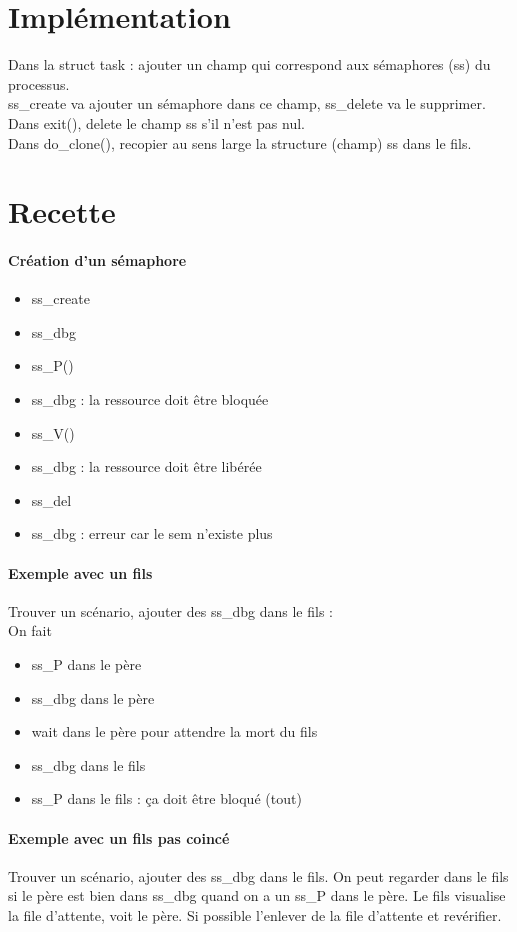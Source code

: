 \documentclass[12pt]{article}
\begin{document}
\newpage
\section{Implémentation}
Dans la struct task : ajouter un champ qui correspond aux sémaphores (ss) du processus. \\
ss\_create va ajouter un sémaphore dans ce champ, ss\_delete va le supprimer. \\
Dans exit(), delete le champ ss s'il n'est pas nul. \\
Dans do\_clone(), recopier au sens large la structure (champ) ss dans le fils.

\newpage
\section{Recette}
\paragraph{Création d'un sémaphore}
\begin{itemize}
  \item ss\_create
  \item ss\_dbg
  \item ss\_P()
  \item ss\_dbg : la ressource doit être bloquée
  \item ss\_V()
  \item ss\_dbg : la ressource doit être libérée
  \item ss\_del
  \item ss\_dbg : erreur car le sem n'existe plus
\end{itemize}

\paragraph{Exemple avec un fils}
Trouver un scénario, ajouter des ss\_dbg dans le fils : \\
On fait
\begin{itemize}
  \item ss\_P dans le père
  \item ss\_dbg dans le père
  \item wait dans le père pour attendre la mort du fils
  \item ss\_dbg dans le fils
  \item ss\_P dans le fils : ça doit être bloqué (tout)
\end{itemize}

\paragraph{Exemple avec un fils pas coincé}
Trouver un scénario, ajouter des ss\_dbg dans le fils. On peut regarder dans le fils si le père est bien dans ss\_dbg quand on a un ss\_P dans le père. Le fils visualise la file d'attente, voit le père. Si possible l'enlever de la file d'attente et revérifier.
\end{document}
